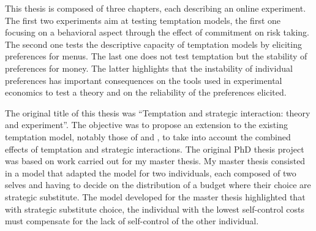 \documentclass[
]{book}
\begin{document}
This thesis is composed of three chapters, each describing an online experiment.
The first two experiments aim at testing temptation models, the first one
focusing on a behavioral aspect through the effect of commitment on risk taking.
The second one tests the descriptive capacity of temptation models by eliciting
preferences for menus.
The last one does not test temptation but the stability of preferences for money.
The latter highlights that the instability of individual preferences has
important consequences on the tools used in experimental economics to test a
theory and on the reliability of the preferences elicited.

The original title of this thesis was ``Temptation and strategic interaction:
theory and experiment''.
The objective was to propose an extension to the existing temptation model,
notably those of \citet{gul2001temptation} and \citet{fudenberg2006dual}, to take into account the combined effects of temptation and strategic interactions.
The original PhD thesis project was based on work carried out for my master thesis.
My master thesis consisted in a model that adapted the \citet{fudenberg2006dual} model for two individuals, each composed of two selves and having to decide on the distribution of a budget where their choice
are strategic substitute.
The model developed for the master thesis highlighted that with strategic substitute choice, the
individual with the lowest self-control costs must compensate for the lack of
self-control of the other individual.
\end{document}

